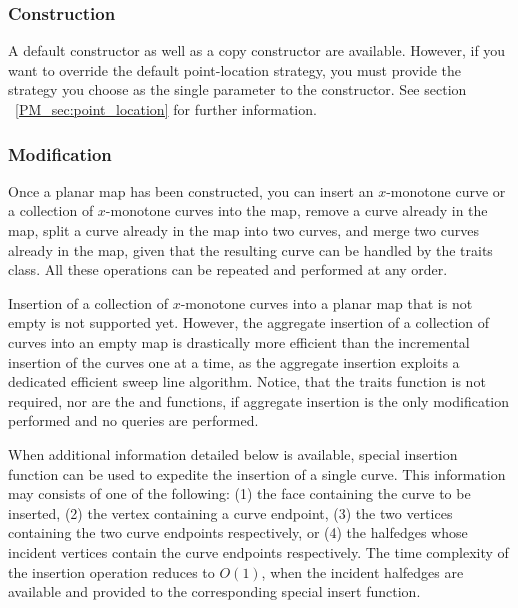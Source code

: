 \subsubsection{Construction}
A default constructor as well as a copy constructor are
available. However, if you want to override the default point-location
strategy, you must provide the strategy you choose as the single
parameter to the constructor. See section
~\ref{PM_sec:point_location} for further information.

\subsubsection{Modification}
Once a planar map has been constructed, you can insert an $x$-monotone
curve or a collection of $x$-monotone curves into the map, remove a
curve already in the map, split a curve already in the map into two
curves, and merge two curves already in the map, given that the
resulting curve can be handled by the traits class. All these
operations can be repeated and performed at any order.

Insertion of a collection of $x$-monotone curves into a planar map
that is not empty is not supported yet. However, the aggregate
insertion of a collection of curves into an empty map is drastically
more efficient than the incremental insertion of the curves one at a
time, as the aggregate insertion exploits a dedicated efficient sweep
line algorithm. Notice, that the traits function
 is not required, nor are the
 and 
functions, if aggregate insertion is the only modification performed
and no queries are performed. 



When additional information detailed below is available, special
insertion function can be used to expedite the insertion of a single
curve. This information may consists of one of the following: (1) the
face containing the curve to be inserted, (2) the vertex containing a
curve endpoint, (3) the two vertices containing the two curve
endpoints respectively, or (4) the halfedges whose incident vertices
contain the curve endpoints respectively. The time complexity of the
insertion operation reduces to $O(1)$, when the incident halfedges are
available and provided to the corresponding special insert function.

